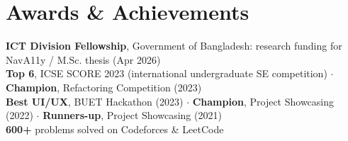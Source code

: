 \documentclass[letterpaper,11pt]{article}
\newcommand{\resumeSubHeadingListStart}{\begin{itemize}[leftmargin=0.15in, label={}]}
\newcommand{\resumeSubHeadingListEnd}{\end{itemize}}
\begin{document}
\section{Awards \& Achievements}
  \vspace{2pt}
  \resumeSubHeadingListStart
    \small{\item{
        \textbf{ICT Division Fellowship}, Government of Bangladesh: research funding for NavA11y / M.Sc. thesis (Apr 2026) \\ \vspace{3pt}
        \textbf{Top 6}, ICSE SCORE 2023 (international undergraduate SE competition) \hspace{6pt}$\cdot$\hspace{6pt}
        \textbf{Champion}, Refactoring Competition (2023) \\ \vspace{3pt}
        \textbf{Best UI/UX}, BUET Hackathon (2023) \hspace{6pt}$\cdot$\hspace{6pt}
        \textbf{Champion}, Project Showcasing (2022) \hspace{6pt}$\cdot$\hspace{6pt}
        \textbf{Runners-up}, Project Showcasing (2021) \\ \vspace{3pt}
        \textbf{600+} problems solved on Codeforces \& LeetCode
    }}
  \resumeSubHeadingListEnd


\end{document}

